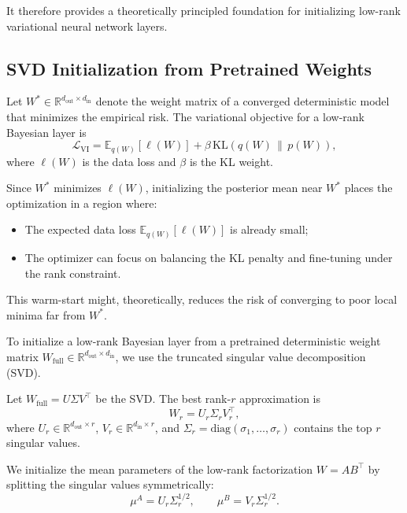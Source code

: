\documentclass{article}
\theoremstyle{plain}
\theoremstyle{definition}
\theoremstyle{remark}
\begin{document}
It therefore provides a theoretically principled foundation for initializing low-rank variational neural network layers.
\subsection{SVD Initialization from Pretrained Weights}
\label{app:svd init}
Let $W^* \in \mathbb{R}^{d_{\text{out}} \times d_{\text{in}}}$ denote the weight matrix of a converged deterministic model that minimizes the empirical risk. The variational objective for a low-rank Bayesian layer is
\begin{equation}
\mathcal{L}_{\text{VI}} = \mathbb{E}_{q(W)}[\ell(W)] + \beta \, \text{KL}(q(W) \,\|\, p(W)),
\end{equation}
where $\ell(W)$ is the data loss and $\beta$ is the KL weight.

Since $W^*$ minimizes $\ell(W)$, initializing the posterior mean near $W^*$ places the optimization in a region where:
\begin{itemize}
    \item The expected data loss $\mathbb{E}_{q(W)}[\ell(W)]$ is already small;
    \item The optimizer can focus on balancing the KL penalty and fine-tuning under the rank constraint.
\end{itemize}

This warm-start might, theoretically, reduces the risk of converging to poor local minima far from $W^*$.

To initialize a low-rank Bayesian layer from a pretrained deterministic weight matrix $W_{\text{full}} \in \mathbb{R}^{d_{\text{out}} \times d_{\text{in}}}$, we use the truncated singular value decomposition (SVD).

Let $W_{\text{full}} = U\Sigma V^\top$ be the SVD. The best rank-$r$ approximation is
\begin{equation}
W_r = U_r \Sigma_r V_r^\top,
\end{equation}
where $U_r \in \mathbb{R}^{d_{\text{out}} \times r}$, $V_r \in \mathbb{R}^{d_{\text{in}} \times r}$, and $\Sigma_r = \text{diag}(\sigma_1, \ldots, \sigma_r)$ contains the top $r$ singular values.

We initialize the mean parameters of the low-rank factorization $W = AB^\top$ by splitting the singular values symmetrically:
\begin{equation}
\mu^A = U_r \Sigma_r^{1/2}, \qquad \mu^B = V_r \Sigma_r^{1/2}.
\end{equation}
\end{document}
